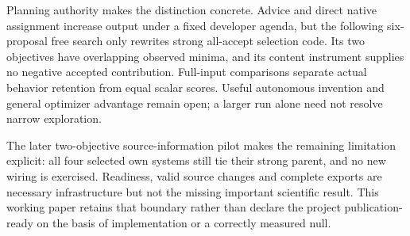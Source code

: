 Planning authority makes the distinction concrete. Advice and direct native
assignment increase output under a fixed developer agenda, but the following
six-proposal free search only rewrites strong all-accept selection code.
Its two objectives have overlapping observed minima, and its content instrument
supplies no negative accepted contribution. Full-input comparisons separate
actual behavior retention from equal scalar scores. Useful autonomous invention
and general optimizer advantage remain open; a larger run alone need not
resolve narrow exploration.

The later two-objective source-information pilot makes the remaining limitation
explicit: all four selected own systems still tie their strong parent, and no
new wiring is exercised. Readiness, valid source changes and complete exports
are necessary infrastructure but not the missing important scientific result.
This working paper retains that boundary rather than declare the project
publication-ready on the basis of implementation or a correctly measured null.
